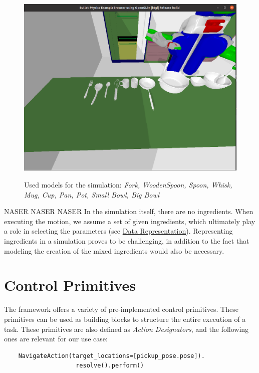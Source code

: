 \begin{figure}[H]
    \includegraphics[scale=0.35]{Graphics/toolscontainersmodels.png}
    \label{fig:toolscontainersmodels}
    \caption{Used models for the simulation: \textit{Fork, WoodenSpoon, Spoon, Whisk, Mug, Cup, Pan, Pot, Small Bowl, Big Bowl}}
\end{figure}

NASER NASER NASER
In the simulation itself, there are no ingredients. When executing the motion, we assume a set of given ingredients, which ultimately play a role in selecting the parameters (see \hyperref[chap:Data_representation]{Data Representation}). Representing ingredients in a simulation proves to be challenging, in addition to the fact that modeling the creation of the mixed ingredients would also be necessary.
\section{Control Primitives}
The framework  offers a variety of pre-implemented control primitives. These primitives can be used as building blocks to structure the entire execution of a task. These primitives are also defined as \textit{Action Designators}, and the following ones are relevant for our use case:

\begin{lstlisting}
	NavigateAction(target_locations=[pickup_pose.pose]).
					resolve().perform()
\end{lstlisting}

\newpage

